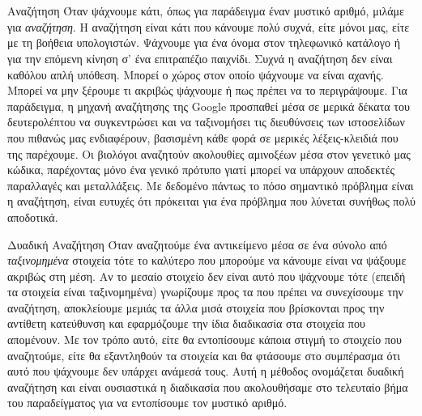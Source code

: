 \documentclass[a4paper,11pt,oneside]{book}
\begin{document}

\section*{}
\hrulefill


\begin{theory}{Αναζήτηση}
Όταν ψάχνουμε κάτι, όπως για παράδειγμα έναν μυστικό αριθμό, μιλάμε για \emph{αναζήτηση}. Η αναζήτηση είναι κάτι που κάνουμε πολύ συχνά, είτε μόνοι μας, είτε με τη βοήθεια υπολογιστών. Ψάχνουμε για ένα όνομα στον τηλεφωνικό κατάλογο ή για την επόμενη κίνηση σ' ένα επιτραπέζιο παιχνίδι. Συχνά η αναζήτηση δεν είναι καθόλου απλή υπόθεση. Μπορεί ο χώρος στον οποίο ψάχνουμε να είναι αχανής. Μπορεί να μην ξέρουμε τι ακριβώς ψάχνουμε ή πως πρέπει να το περιγράψουμε. Για παράδειγμα, η μηχανή αναζήτησης της Google προσπαθεί μέσα σε μερικά δέκατα του δευτερολέπτου να συγκεντρώσει και να ταξινομήσει τις διευθύνσεις των ιστοσελίδων που πιθανώς μας ενδιαφέρουν, βασισμένη κάθε φορά σε μερικές λέξεις-κλειδιά που της παρέχουμε. Οι βιολόγοι αναζητούν ακολουθίες αμινοξέων μέσα στον γενετικό μας κώδικα, παρέχοντας μόνο ένα γενικό πρότυπο γιατί μπορεί να υπάρχουν αποδεκτές παραλλαγές και μεταλλάξεις. Με δεδομένο πάντως το πόσο σημαντικό πρόβλημα είναι η αναζήτηση, είναι ευτυχές ότι πρόκειται για ένα πρόβλημα που λύνεται συνήθως πολύ αποδοτικά.
\end{theory}

\begin{theory}{Δυαδική Αναζήτηση}
Όταν αναζητούμε ένα αντικείμενο μέσα σε ένα σύνολο από \emph{ταξινομημένα} στοιχεία τότε το καλύτερο που μπορούμε να κάνουμε είναι να ψάξουμε ακριβώς στη μέση. Αν το μεσαίο στοιχείο δεν είναι αυτό που ψάχνουμε τότε (επειδή τα στοιχεία είναι ταξινομημένα) γνωρίζουμε προς τα που πρέπει να συνεχίσουμε την αναζήτηση, αποκλείουμε μεμιάς τα άλλα μισά στοιχεία που βρίσκονται προς την αντίθετη κατεύθυνση και εφαρμόζουμε την ίδια διαδικασία στα στοιχεία που απομένουν. Με τον τρόπο αυτό, είτε θα εντοπίσουμε κάποια στιγμή το στοιχείο που αναζητούμε, είτε θα εξαντληθούν τα στοιχεία και θα φτάσουμε στο συμπέρασμα ότι αυτό που ψάχνουμε δεν υπάρχει ανάμεσά τους. Αυτή η μέθοδος ονομάζεται δυαδική αναζήτηση και είναι ουσιαστικά η διαδικασία που ακολουθήσαμε στο τελευταίο βήμα του παραδείγματος για να εντοπίσουμε τον μυστικό αριθμό. 
\end{theory}
\end{document}
